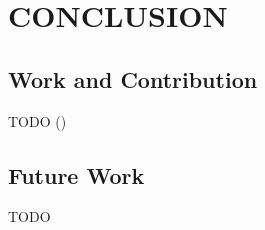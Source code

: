 
\chapter{CONCLUSION}

\section{Work and Contribution}

TODO (\cite{routh2009anatomical})

\section{Future Work}

TODO












